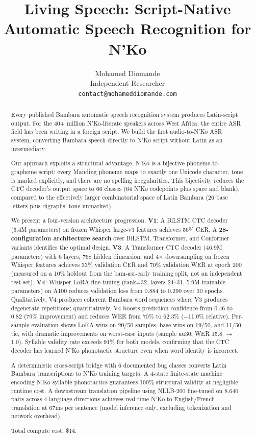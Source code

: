 \documentclass[11pt]{article}
\title{Living Speech: Script-Native Automatic Speech Recognition for N'Ko}
\author{
  Mohamed Diomande \\
  Independent Researcher \\
  \texttt{contact@mohameddiomande.com}
}
\begin{document}
\maketitle

\begin{abstract}
Every published Bambara automatic speech recognition system produces Latin-script output.
For the 40+ million N'Ko-literate speakers across West Africa, the entire ASR field has been writing in a foreign script.
We build the first audio-to-N'Ko ASR system, converting Bambara speech directly to N'Ko script without Latin as an intermediary.

Our approach exploits a structural advantage.
N'Ko is a bijective phoneme-to-grapheme script: every Manding phoneme maps to exactly one Unicode character, tone is marked explicitly, and there are no spelling irregularities.
This bijectivity reduces the CTC decoder's output space to 66 classes (64 N'Ko codepoints plus space and blank), compared to the effectively larger combinatorial space of Latin Bambara (26 base letters plus digraphs, tone-unmarked).

We present a four-version architecture progression.
\textbf{V1}: A BiLSTM CTC decoder (5.4M parameters) on frozen Whisper large-v3 features achieves 56\% CER.
A \textbf{28-configuration architecture search} over BiLSTM, Transformer, and Conformer variants identifies the optimal design.
\textbf{V3}: A Transformer CTC decoder (46.9M parameters) with 6 layers, 768 hidden dimension, and 4$\times$ downsampling on frozen Whisper features achieves 33\% validation CER and 70\% validation WER at epoch 200 (measured on a 10\% holdout from the bam-asr-early training split, not an independent test set).
\textbf{V4}: Whisper LoRA fine-tuning (rank=32, layers 24--31, 5.9M trainable parameters) on A100 reduces validation loss from 0.884 to 0.290 over 30 epochs.
Qualitatively, V4 produces coherent Bambara word sequences where V3 produces degenerate repetitions; quantitatively, V4 boosts prediction confidence from 0.46 to 0.82 (79\% improvement) and reduces WER from 70\% to 62.3\% ($-$11.0\% relative).
Per-sample evaluation shows LoRA wins on 20/50 samples, base wins on 19/50, and 11/50 tie, with dramatic improvements on worst-case inputs (sample au30: WER 15.8 $\to$ 1.0).
Syllable validity rate exceeds 91\% for both models, confirming that the CTC decoder has learned N'Ko phonotactic structure even when word identity is incorrect.

A deterministic cross-script bridge with 6 documented bug classes converts Latin Bambara transcriptions to N'Ko training targets.
A 4-state finite-state machine encoding N'Ko syllable phonotactics guarantees 100\% structural validity at negligible runtime cost.
A downstream translation pipeline using NLLB-200 fine-tuned on 8,640 pairs across 4 language directions achieves real-time N'Ko-to-English/French translation at 67ms per sentence (model inference only, excluding tokenization and network overhead).

Total compute cost: \$14.
\end{abstract}
\end{document}
